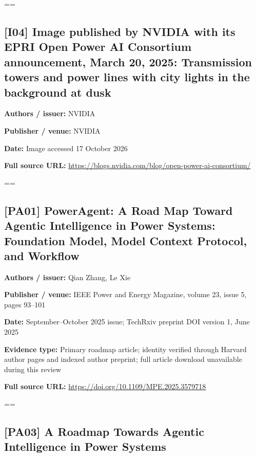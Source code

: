 \documentclass[10pt,letterpaper]{article}
\begin{document}
\setbox\readingEntry=\vbox\bgroup\hsize=\linewidth\subsection*{[I04] Image published by NVIDIA with its EPRI Open Power AI Consortium announcement, March 20, 2025: Transmission towers and power lines with city lights in the background at dusk}
\textbf{Authors / issuer:} NVIDIA\par
\textbf{Publisher / venue:} NVIDIA\par
\textbf{Date:} Image accessed 17 October 2026\par
\textbf{Full source URL:} \href{https://blogs.nvidia.com/blog/open-power-ai-consortium/}{\small\ttfamily https:/\allowbreak{}/\allowbreak{}blogs.\allowbreak{}nvidia.\allowbreak{}com/\allowbreak{}blog/\allowbreak{}open-\allowbreak{}power-\allowbreak{}ai-\allowbreak{}consortium/\allowbreak{}}\par
\egroup\par\noindent\box\readingEntry\par\medskip
\setbox\readingEntry=\vbox\bgroup\hsize=\linewidth\subsection*{[PA01] PowerAgent: A Road Map Toward Agentic Intelligence in Power Systems: Foundation Model, Model Context Protocol, and Workflow}
\textbf{Authors / issuer:} Qian Zhang, Le Xie\par
\textbf{Publisher / venue:} IEEE Power and Energy Magazine, volume 23, issue 5, pages 93--101\par
\textbf{Date:} September--October 2025 issue; TechRxiv preprint DOI version 1, June 2025\par
\textbf{Evidence type:} Primary roadmap article; identity verified through Harvard author pages and indexed author preprint; full article download unavailable during this review\par
\textbf{Full source URL:} \href{https://doi.org/10.1109/MPE.2025.3579718}{\small\ttfamily https:/\allowbreak{}/\allowbreak{}doi.\allowbreak{}org/\allowbreak{}10.\allowbreak{}1109/\allowbreak{}MPE.\allowbreak{}2025.\allowbreak{}3579718}\par
\egroup\par\noindent\box\readingEntry\par\medskip
\setbox\readingEntry=\vbox\bgroup\hsize=\linewidth\subsection*{[PA03] A Roadmap Towards Agentic Intelligence in Power Systems}
\end{document}
